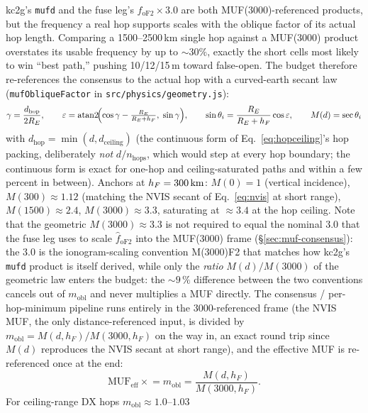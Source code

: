 \documentclass[11pt,a4paper]{article}
\newcommand{\SI}[2]{#1\,\text{#2}}
\newcommand{\km}{\text{km}}
\begin{document}
kc2g's \texttt{mufd} and the fuse leg's $f_{\text{oF2}} \times
3.0$ are both MUF(3000)-referenced products, but the frequency a
real hop supports scales with the oblique factor of its actual
hop length.  Comparing a 1500--2500\,km single hop against a
MUF(3000) product overstates its usable frequency by up to
${\sim}30\%$, exactly the short cells most likely to win
``best path,'' pushing 10/12/15\,m toward false-open.  The budget
therefore re-references the consensus to the actual hop with a
curved-earth secant law (\texttt{mufObliqueFactor} in
\texttt{src/physics/geometry.js}):
\begin{equation}\label{eq:mufoblique}
  \gamma = \frac{d_{\text{hop}}}{2 R_E}, \qquad
  \varepsilon = \operatorname{atan2}\!\Bigl(\cos\gamma -
    \tfrac{R_E}{R_E + h_F},\; \sin\gamma\Bigr), \qquad
  \sin\theta_i = \frac{R_E}{R_E + h_F}\cos\varepsilon, \qquad
  M(d) = \sec\theta_i
\end{equation}
with $d_{\text{hop}} = \min(d, d_{\text{ceiling}})$ (the
continuous form of Eq.~\ref{eq:hopceiling}'s hop packing,
deliberately \emph{not} $d/n_{\text{hops}}$, which would step at
every hop boundary; the continuous form is exact for one-hop and
ceiling-saturated paths and within a few percent in between).
Anchors at $h_F = \SI{300}{\km}$: $M(0) = 1$ (vertical
incidence), $M(300) \approx 1.12$ (matching the NVIS secant of
Eq.~\ref{eq:nvis} at short range), $M(1500) \approx 2.4$,
$M(3000) \approx 3.3$, saturating at ${\approx}3.4$ at the hop
ceiling.  Note that the geometric $M(3000) \approx 3.3$ is not
required to equal the nominal $3.0$ that the fuse leg uses to
scale $\hat{f}_{\text{oF2}}$ into the MUF(3000) frame
(\S\ref{sec:muf-consensus}): the $3.0$ is the ionogram-scaling
convention M(3000)F2 that matches how kc2g's \texttt{mufd}
product is itself derived, while only the \emph{ratio}
$M(d)/M(3000)$ of the geometric law enters the budget: the
${\sim}9\,\%$ difference between the two conventions cancels
out of $m_{\text{obl}}$ and never multiplies a MUF directly.  The consensus / per-hop-minimum pipeline runs entirely
in the 3000-referenced frame (the NVIS MUF, the only
distance-referenced input, is divided by
$m_{\text{obl}} = M(d, h_F)/M(3000, h_F)$ on the way in, an
exact round trip since $M(d)$ reproduces the NVIS secant at
short range), and the effective MUF is re-referenced once at the
end:
\begin{equation}
  \text{MUF}_{\text{eff}} \mathrel{\times}= m_{\text{obl}}
    = \frac{M(d, h_F)}{M(3000, h_F)}.
\end{equation}
For ceiling-range DX hops $m_{\text{obl}} \approx 1.0$--$1.03$
\end{document}
